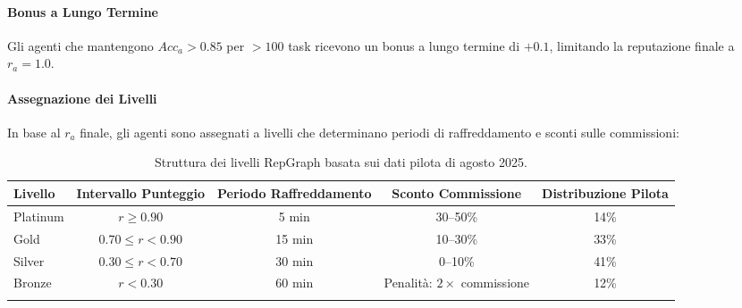 \documentclass[11pt]{article}
\begin{document}
\paragraph{Bonus a Lungo Termine} Gli agenti che mantengono $Acc_a > 0.85$ per $>100$ task ricevono un bonus a lungo termine di $+0.1$, limitando la reputazione finale a $r_a = 1.0$.

\paragraph{Assegnazione dei Livelli} In base al $r_a$ finale, gli agenti sono assegnati a livelli che determinano periodi di raffreddamento e sconti sulle commissioni:
\begin{longtable}{@{}lcccc@{}}
\toprule
\textbf{Livello} & \textbf{Intervallo Punteggio} & \textbf{Periodo Raffreddamento} & \textbf{Sconto Commissione} & \textbf{Distribuzione Pilota} \\\midrule
Platinum & $r \geq 0.90$ & 5 min & 30--50\% & 14\% \\
Gold & $0.70 \leq r < 0.90$ & 15 min & 10--30\% & 33\% \\
Silver & $0.30 \leq r < 0.70$ & 30 min & 0--10\% & 41\% \\
Bronze & $r < 0.30$ & 60 min & Penalità: $2 \times$ commissione & 12\% \\\bottomrule
\caption{Struttura dei livelli RepGraph basata sui dati pilota di agosto 2025.}
\label{tab:reputation-tiers}
\end{longtable}
\end{document}
